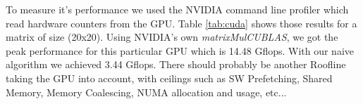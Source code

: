 \documentclass[a4paper,10pt,openright,openbib,twocolumn]{article}
\begin{document}
To measure it's performance we used the NVIDIA command line profiler which read hardware counters from the GPU. Table \ref{tab:cuda} shows those results for a matrix of size (20x20). Using NVIDIA's own \emph{matrixMulCUBLAS}, we got the peak performance for this particular GPU which is 14.48 Gflops. With our naive algorithm we achieved 3.44 Gflops. There should probably be another Roofline taking the GPU into account, with ceilings such as SW Prefetching, Shared Memory, Memory Coalescing, NUMA allocation and usage, etc...

\begin{table}[!htp]
	\footnotesize
\end{table}
\end{document}
